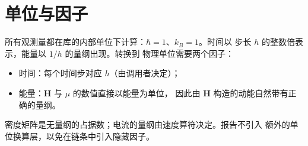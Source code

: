 \section{单位与因子}
\label{sec:units}

所有观测量都在库的内部单位下计算：$\hbar=1$、$k_B=1$。时间以
步长 $h$ 的整数倍表示，能量以 $1/h$ 的量纲出现。转换到
物理单位需要两个因子：
\begin{itemize}
    \item 时间：每个时间步对应 $h$（由调用者决定）；
    \item 能量：$\bm{H}$ 与 $\mu$ 的数值直接以能量为单位，
          因此由 $\bm{H}$ 构造的动能自然带有正确的量纲。
\end{itemize}
密度矩阵是无量纲的占据数；电流的量纲由速度算符决定。报告不引入
额外的单位换算层，以免在链条中引入隐藏因子。
